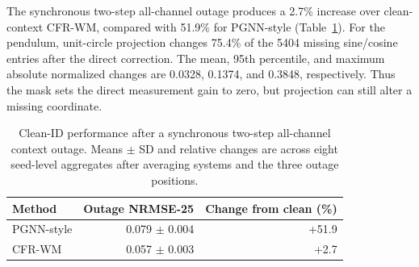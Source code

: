 \documentclass[pdflatex,sn-basic]{sn-jnl}
\newcommand{\ProjectionMissingEntries}{5404}
\newcommand{\ProjectionChangedFraction}{75.4}
\newcommand{\ProjectionMeanChange}{0.0328}
\newcommand{\ProjectionPChange}{0.1374}
\newcommand{\ProjectionMaxChange}{0.3848}
\begin{document}
\begin{table}[t]
\centering
\caption{Classical baselines and inference-time residual-scale
analysis. Entries are seed-balanced mean NRMSE-25 across the indicated fixed
cells. The scale analysis holds trained CFR-WM weights fixed and isolates the
residual contribution.}
\label{tab:posthoc-baseline}
\end{table}

The synchronous two-step all-channel outage produces a 2.7\% increase over
clean-context CFR-WM, compared with 51.9\% for PGNN-style
(Table~\ref{tab:structured-outage}). For the pendulum, unit-circle projection
changes \ProjectionChangedFraction\% of the \ProjectionMissingEntries{}
missing sine/cosine entries after the direct correction. The mean, 95th
percentile, and maximum absolute normalized changes are \ProjectionMeanChange{},
\ProjectionPChange{}, and \ProjectionMaxChange{}, respectively. Thus the mask
sets the direct measurement gain to zero, but projection can still alter a
missing coordinate.

\begin{table}[t]
\centering
\caption{Clean-ID performance after a synchronous two-step all-channel context
outage. Means $\pm$ SD and relative changes are across eight seed-level
aggregates after averaging systems and the three outage positions.}
\label{tab:structured-outage}
\begin{tabular}{lrr}
\toprule
Method & Outage NRMSE-25 & Change from clean (\%) \\
\midrule
PGNN-style & 0.079 $\pm$ 0.004 & +51.9 \\
CFR-WM & 0.057 $\pm$ 0.003 & +2.7 \\
\bottomrule
\end{tabular}
\end{table}
\end{document}
